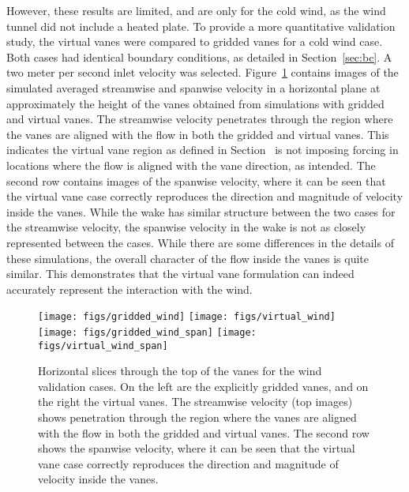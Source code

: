 %
%
%
However, these results are limited, and are
only for the cold wind, as the wind tunnel did not include a heated plate.
To provide a more quantitative validation study, the virtual vanes were
compared to gridded vanes for a cold wind case. Both cases had identical
boundary conditions, as detailed in Section~\ref{sec:bc}. A two meter
per second inlet velocity was selected. 
Figure~\ref{fig:wind_val} contains images of the simulated averaged
streamwise and  spanwise velocity in a horizontal plane at approximately
the height of the vanes obtained from simulations with gridded and
virtual vanes. 
The streamwise velocity penetrates through the region where the vanes
are aligned with the flow in both the gridded and virtual vanes. This
indicates the virtual vane region as defined in
Section~\label{subsec:vane} is not imposing forcing in locations where
the flow is aligned with the vane direction, as intended. 
The second row contains images of the spanwise velocity, where it can be
seen that the virtual vane case correctly reproduces the direction and
magnitude of velocity inside the vanes. While the wake has similar
structure between the two cases for the streamwise velocity, the
spanwise velocity in the wake is not as closely represented between the
cases. While there are some differences in the
details of these simulations, the overall character of the flow
inside the vanes is quite similar. This demonstrates that the virtual
vane formulation can indeed accurately represent the interaction with the wind.

\begin{figure}
  \centering
  \texttt{[image: figs/gridded\_wind]}
  \hfill
  \texttt{[image: figs/virtual\_wind]}
  \\
  \texttt{[image: figs/gridded\_wind\_span]}
  \hfill
  \texttt{[image: figs/virtual\_wind\_span]}
  \label{fig:wind_val}
 \caption{Horizontal slices through the top of the vanes for the
 wind validation cases. On the left are the explicitly gridded vanes,
 and on the right the virtual vanes. The streamwise velocity (top
 images) shows penetration through the region where the vanes are aligned
 with the flow in both the gridded and virtual vanes. The second row
 shows the spanwise velocity, where it can be seen that the virtual vane
 case correctly reproduces the direction and magnitude of velocity
 inside the vanes.} 
\end{figure}



